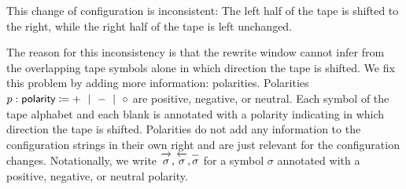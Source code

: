 \begin{example}
\begin{center}
  \end{center}
  This change of configuration is inconsistent: The left half of the tape is shifted to the right, while the right half of the tape is left unchanged.
\end{example}

The reason for this inconsistency is that the rewrite window cannot infer from the overlapping tape symbols alone in which direction the tape is shifted. 
We fix this problem by adding more information: polarities. Polarities $p : \textsf{polarity}{} \coloneqq + ~\mid~ - ~\mid~ \circ{}$ are positive, negative, or neutral. 
Each symbol of the tape alphabet and each blank is annotated with a polarity indicating in which direction the tape is shifted. Polarities do not add any information to the configuration strings in their own right and are just relevant for the configuration changes.
Notationally, we write $\polpos{\sigma}, \polneg{\sigma}, \polneut{\sigma}$ for a symbol $\sigma$ annotated with a positive, negative, or neutral polarity.


